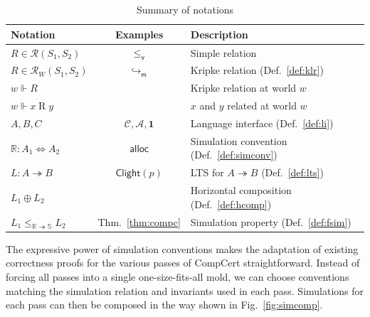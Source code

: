 \documentclass[11pt,oneside,draft]{book}
\theoremstyle{definition}
\newcommand{\kw}[1]{\ensuremath{ \mathsf{#1} }}
\newcommand{\que}{\circ}         %
\newcommand{\ans}{\bullet}       %
\newcommand{\vref}{\le_\kw{v}}   %
\newcommand{\figsize}{}
\begin{document}
\begin{table} %
  \centering
  \figsize
  \begin{tabular}{lcl}
    \hline
    Notation & Examples & Description \\
    \hline
    $R \in \mathcal{R}(S_1, S_2)$ &
      $\vref$ &
      Simple relation \\
    $R \in \mathcal{R}_W(S_1, S_2)$ &
      $\hookrightarrow_\kw{m}$ &
      Kripke relation (Def.~\ref{def:klr}) \\
    $w \Vdash R$ & &
      Kripke relation at world $w$ \\
    $w \Vdash x \mathrel{R} y$ & &
      $x$ and $y$ related at world $w$ \\
    \hline
    $A, B, C$ &
      $\mathcal{C}, \mathcal{A}, \mathbf{1}$ &
      Language interface (Def.~\ref{def:li}) \\
    $\mathbb{R} : A_1 \Leftrightarrow A_2$ &
      $\kw{alloc}$ &
      Simulation convention (Def.~\ref{def:simconv}) \\
    $L : A \twoheadrightarrow B$ &
      $\kw{Clight}(p)$ &
      LTS for $A \twoheadrightarrow B$ (Def.~\ref{def:lts}) \\
    $L_1 \oplus L_2$ & &
      Horizontal composition (Def.~\ref{def:hcomp}) \\
    $L_1 \le_{\mathbb{R} \twoheadrightarrow \mathbb{S}} L_2$ &
      Thm.~\ref{thm:compc} &
      Simulation property (Def.~\ref{def:fsim}) \\
    \hline
  \end{tabular}
  \caption{Summary of notations}
  \label{tbl:notations}
\end{table}

The expressive power of simulation conventions
makes the adaptation of existing correctness proofs
for the various passes of CompCert straightforward.
Instead of forcing all passes into a single one-size-fits-all mold,
we can choose conventions matching
the simulation relation and invariants
used in each pass.
Simulations for each pass can then be composed
in the way shown in Fig.~\ref{fig:simcomp}.
\end{document}
